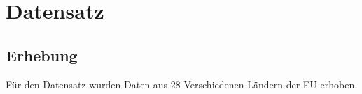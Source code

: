 \section{Datensatz}

\nocite{eb794}
\subsection{Erhebung}

Für den Datensatz wurden Daten aus 28 Verschiedenen Ländern der EU erhoben.

